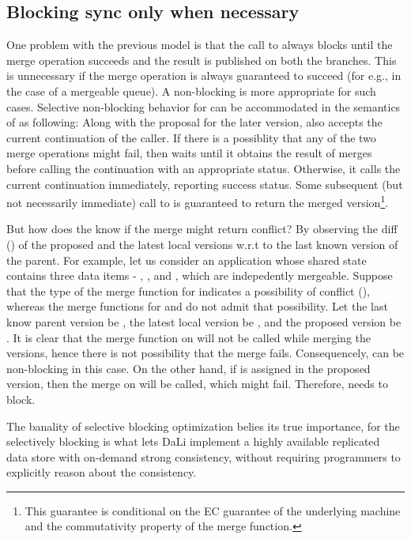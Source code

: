 \subsection{Blocking sync only when necessary}

One problem with the previous model is that the call to
 always blocks until the merge operation
succeeds and the result is published on both the branches. This is
unnecessary if the merge operation is always guaranteed to succeed (for
e.g., in the case of a mergeable queue). A non-blocking  is
more appropriate for such cases. Selective non-blocking behavior for
can be accommodated in the semantics of  as following: Along
with the proposal for the later version,  also accepts the
current continuation of the caller. If there is a possiblity that any
of the two merge operations might fail, then  waits until it
obtains the result of merges before calling the continuation with an
appropriate status.  Otherwise, it calls the current continuation
immediately, reporting success status. Some subsequent (but not
necessarily immediate) call to  is guaranteed
to return the merged version\footnote{This guarantee is conditional on
the EC guarantee of the underlying machine and the commutativity
property of the merge function.}.

But how does the  know if the merge might return conflict? By
observing the diff () of the proposed and the latest local
versions w.r.t to the last known version of the parent. For example,
let us consider an application whose shared state contains three data
items - , , and , which are indepedently mergeable. Suppose
that the type of the merge function for  indicates a possibility of
conflict (), whereas the merge
functions for  and  do not admit that possibility. Let the last
know parent version be , the latest local version
be , and the proposed version be . It is clear that the merge function on  will not be called
while merging the versions, hence there is not possibility that the
merge fails. Consequencely,  can be non-blocking in this case.
On the other hand, if  is assigned  in the proposed version,
then the merge on  will be called, which might fail. Therefore,
 needs to block.

The banality of selective blocking optimization belies its true
importance, for the selectively blocking  is what lets DaLi
implement a highly available replicated data store with on-demand
strong consistency, without requiring programmers to explicitly reason
about the consistency.  

